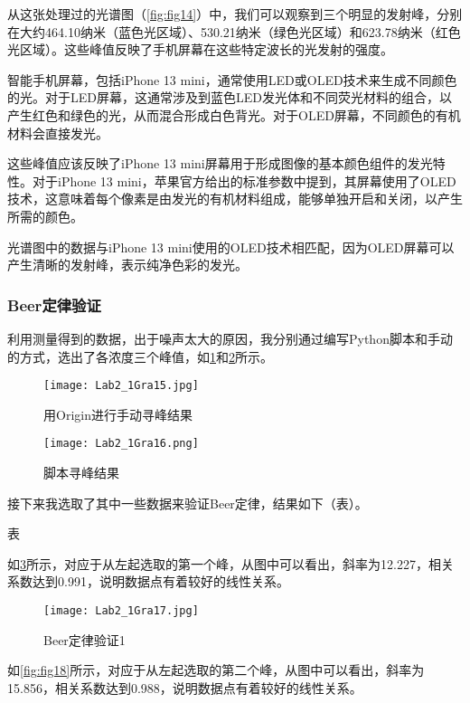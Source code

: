 \documentclass[dvipsnames, svgnames,a4paper,11pt]{article}
\begin{document}
\begin{enumerate}
		从这张处理过的光谱图（\cref{fig:fig14}）中，我们可以观察到三个明显的发射峰，分别在大约464.10纳米（蓝色光区域）、530.21纳米（绿色光区域）和623.78纳米（红色光区域）。这些峰值反映了手机屏幕在这些特定波长的光发射的强度。
		
		智能手机屏幕，包括iPhone 13 mini，通常使用LED或OLED技术来生成不同颜色的光。对于LED屏幕，这通常涉及到蓝色LED发光体和不同荧光材料的组合，以产生红色和绿色的光，从而混合形成白色背光。对于OLED屏幕，不同颜色的有机材料会直接发光。
		
		这些峰值应该反映了iPhone 13 mini屏幕用于形成图像的基本颜色组件的发光特性。对于iPhone 13 mini，苹果官方给出的标准参数中提到，其屏幕使用了OLED技术，这意味着每个像素是由发光的有机材料组成，能够单独开启和关闭，以产生所需的颜色。
		
		光谱图中的数据与iPhone 13 mini使用的OLED技术相匹配，因为OLED屏幕可以产生清晰的发射峰，表示纯净色彩的发光。		
		
	\end{enumerate}
	
	\subsubsection{Beer定律验证}
	利用测量得到的数据，出于噪声太大的原因，我分别通过编写Python脚本和手动的方式，选出了各浓度三个峰值，如\cref{fig:fig15}和\cref{fig:fig16}所示。
	
	\begin{figure}[htbp]
		\centering
		\texttt{[image: Lab2\_1Gra15.jpg]}
		\caption{用Origin进行手动寻峰结果}
		\label{fig:fig15}
	\end{figure}
	
	\begin{figure}[htbp]
		\centering
		\texttt{[image: Lab2\_1Gra16.png]}
		\caption{脚本寻峰结果}
		\label{fig:fig16}
	\end{figure}
	
	接下来我选取了其中一些数据来验证Beer定律，结果如下（表）。
	
	表
	
	如\cref{fig:fig17}所示，对应于从左起选取的第一个峰，从图中可以看出，斜率为12.227，相关系数达到0.991，说明数据点有着较好的线性关系。
	
	\begin{figure}[htbp]
		\centering
		\texttt{[image: Lab2\_1Gra17.jpg]}
		\caption{Beer定律验证1}
		\label{fig:fig17}
	\end{figure}
	
	如\cref{fig:fig18}所示，对应于从左起选取的第二个峰，从图中可以看出，斜率为15.856，相关系数达到0.988，说明数据点有着较好的线性关系。
	
\end{document}
